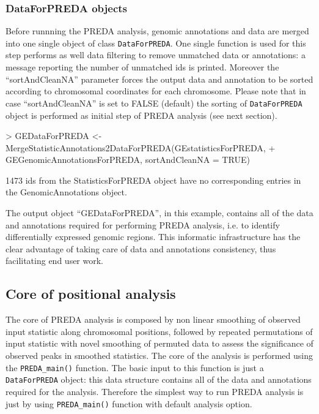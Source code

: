 \documentclass[a4paper,10pt]{article}
\begin{document}
\subsubsection{DataForPREDA objects}
Before runnning the PREDA analysis, genomic annotations and data are merged into one single object of class \texttt{DataForPREDA}. One single function is used for this step performs as well data filtering to remove unmatched data or annotations: a message reporting the number of unmatched ids is printed. Moreover the ``sortAndCleanNA'' parameter forces the output data and annotation to be sorted according to chromosomal coordinates for each chromosome. Please note that in case ``sortAndCleanNA'' is set to FALSE (default) the sorting of \texttt{DataForPREDA} object is performed as initial step of PREDA analysis (see next section).

\begin{Schunk}
\begin{Sinput}
> GEDataForPREDA <- MergeStatisticAnnotations2DataForPREDA(GEstatisticsForPREDA, 
+     GEGenomicAnnotationsForPREDA, sortAndCleanNA = TRUE)
\end{Sinput}
\begin{Soutput}
 1473 ids from the StatisticsForPREDA object have no corresponding entries in the GenomicAnnotations object.
\end{Soutput}
\end{Schunk}

The output object ``GEDataForPREDA'', in this example, contains all of the data and annotations required for performing PREDA analysis, i.e. to identify differentially expressed genomic regions. This informatic infrastructure has the clear advantage of taking care of data and annotations consistency, thus facilitating end user work.



\subsection{Core of positional analysis}
The core of PREDA analysis is composed by non linear smoothing of observed input statistic along chromosomal positions, followed by repeated permutations of input statistic with novel smoothing of permuted data to assess the significance of observed peaks in smoothed statistics. The core of the analysis is performed using the \texttt{PREDA\_main()} function. The basic input to this function is just a \texttt{DataForPREDA} object: this data structure contains all of the data and annotations required for the analysis. Therefore the simplest way to run PREDA analysis is just by using \texttt{PREDA\_main()} function with default analysis option.
\end{document}

